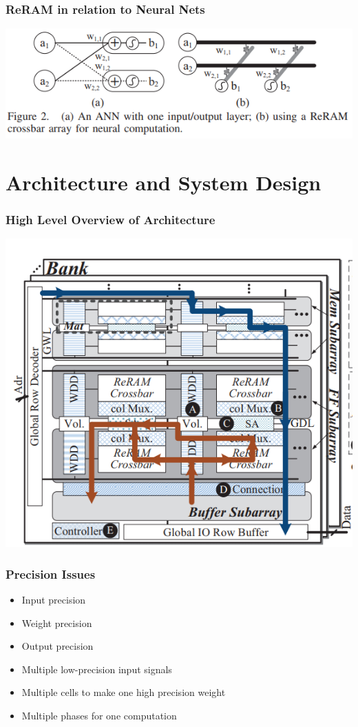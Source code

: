 \documentclass[hyperref={colorlinks}]{beamer}
\begin{document}
\begin{frame}
	\frametitle{ReRAM in relation to Neural Nets}
	\includegraphics[scale=0.5]{reram_nn.png}
\end{frame}

\section{Architecture and System Design}
\begin{frame}
	\frametitle{High Level Overview of Architecture}
	\includegraphics[scale=0.4, center]{prime_arch.png}
\end{frame}

\begin{frame}
	\frametitle{Precision Issues}
	\begin{itemize}
		\item Input precision
		\item Weight precision
		\item Output precision
	\end{itemize}
	\begin{itemize}
		\item Multiple low-precision input signals
		\item Multiple cells to make one high precision weight
		\item Multiple phases for one computation
	\end{itemize}
\end{frame}
\end{document}
